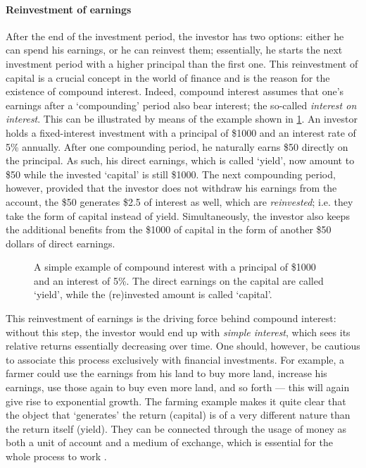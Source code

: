 \paragraph{Reinvestment of earnings}
After the end of the investment period, the investor has two options: either he can spend his earnings, or he can reinvest them; essentially, he starts the next investment period with a higher principal than the first one. This reinvestment of capital is a crucial concept in the world of finance and is the reason for the existence of compound interest. Indeed, compound interest assumes that one's earnings after a `compounding' period also bear interest; the so-called \emph{interest on interest}. This can be illustrated by means of the example shown in \cref{fig:compound_interest}. An investor holds a fixed-interest investment with a principal of \$1000 and an interest rate of 5\% annually. After one compounding period, he naturally earns \$50 directly on the principal. As such, his direct earnings, which is called `yield', now amount to \$50 while the invested `capital' is still \$1000. The next compounding period, however, provided that the investor does not withdraw his earnings from the account, the \$50 generates \$2.5 of interest as well, which are \emph{reinvested}; i.e. they take the form of capital instead of yield. Simultaneously, the investor also keeps the additional benefits from the \$1000 of capital in the form of another \$50 dollars of direct earnings.
\begin{figure}[h]
    \centering
    
    \caption{A simple example of compound interest with a principal of \$1000 and an interest of 5\%. The direct earnings on the capital are called `yield', while the (re)invested amount is called `capital'.}
    \label{fig:compound_interest}
\end{figure}

This reinvestment of earnings is the driving force behind compound interest: without this step, the investor would end up with \emph{simple interest}, which sees its relative returns essentially decreasing over time. One should, however, be cautious to associate this process exclusively with financial investments. For example, a farmer could use the earnings from his land to buy more land, increase his earnings, use those again to buy even more land, and so forth --- this will again give rise to exponential growth. The farming example makes it quite clear that the object that `generates' the return (capital) is of a very different nature than the return itself (yield). They can be connected through the usage of money as both a unit of account and a medium of exchange, which is essential for the whole process to work \cite{Mankiw2017}. 

